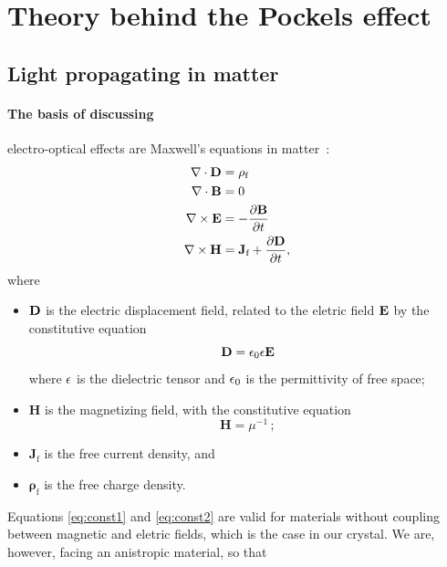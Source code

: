 \section{Theory behind the Pockels effect}

\subsection{Light propagating in matter}
\paragraph{The basis of discussing} 
electro-optical effects are 
Maxwell's equations in matter~\cite{boyd2003nonlinear}:
\begin{subequations} 
\begin{align}
\nabla \cdot \mathbf{D} &= \rho_\text{f} 
\label{eq:max1} \\ 
\nabla \cdot \mathbf{B} &= 0
\label{eq:max2} \\ 
\nabla \times \mathbf{E} &= -\frac{\partial \mathbf{B}} {\partial t}
\label{eq:max3} \\ 
    \nabla \times \mathbf{H} &= \mathbf{J}_\text{f} + 
        \frac{\partial \mathbf{D}} {\partial t}, 
\label{eq:max4}
\end{align}
\label{eq:maxwell}
\end{subequations}
where 
\begin{itemize}
    \item $\mathbf{D}$ is the electric displacement field, related to the eletric field $\mathbf{E}$ 
    by the constitutive equation 
    \begin{equation}
        \mathbf{D} = \epsilon_0 \mathbf{\epsilon} \mathbf{E} 
    \label{eq:const1}
    \end{equation}
    where $\mathbf{\epsilon}$ is the dielectric tensor and $\epsilon_0$ is the permittivity of free 
    space; 
    \item $\mathbf{H}$ is the magnetizing field, with the constitutive equation 
    \begin{equation}
        \mathbf{H} = \mu^{-1} \, ;
    \label{eq:const2}
    \end{equation}
    \item $\mathbf{J}_\text{f}$ is the free current density, and
    \item $\mathbf{\rho}_\text{f}$ is the free charge density.
\end{itemize}
Equations \eqref{eq:const1} and \eqref{eq:const2} are valid for materials without 
coupling between magnetic and eletric fields, which is the case in our 
crystal. We are, however, facing an anistropic material, so that 
